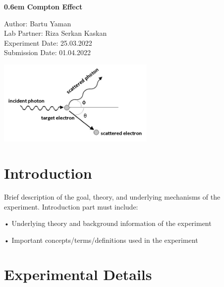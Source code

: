 \documentclass[12pt]{extarticle}
\begin{document}
	
	\clearpage
	\newcommand\nbvspace[1][3]{\vspace*{\stretch{#1}}}
	\newcommand\nbstretchyspace{\spaceskip0.5em plus 0.25em minus 0.25em}
	\newcommand{\nbtitlestretch}{\spaceskip0.6em}
	\begin{center}
		\bfseries
		\nbvspace[1]
		\Huge
		{\nbtitlestretch\huge
			Compton Effect}
		
		\nbvspace[1]
		\normalsize
		
		\footnotesize  
		Author: Bartu Yaman
		\\
		Lab Partner: Riza Serkan Kaskan
		\\
		Experiment Date: 25.03.2022
		\\
		Submission Date: 01.04.2022
		
		
		
		
		\nbvspace[2]
		
		\includegraphics[width=3in]{./images/compton_effect.png}
		\nbvspace[3]
		\normalsize
		
		
		\nbvspace[1]
	\end{center}
	
	\newpage
	\tableofcontents
	\newpage
			
	\section{Introduction}
	
	Brief description of the goal, theory, and underlying mechanisms of the experiment. Introduction part must include:
	
	 •	Underlying theory and background information of the experiment
	 
	 •	Important concepts/terms/definitions used in the experiment
	 
	
	\section{Experimental Details}
	
\end{document}
